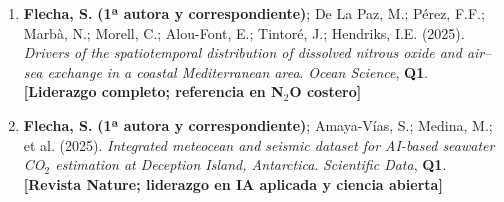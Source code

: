 \documentclass[11pt,a4paper]{article}
\newcommand{\publication}[1]{\item #1}
\begin{document}
\begin{enumerate}[leftmargin=*]
    \publication{\textbf{Flecha, S.} \textbf{(1ª autora y correspondiente)}; De La Paz, M.; Pérez, F.F.; Marbà, N.; Morell, C.; Alou-Font, E.; Tintoré, J.; Hendriks, I.E. (2025). 
    \textit{Drivers of the spatiotemporal distribution of dissolved nitrous oxide and air--sea exchange in a coastal Mediterranean area}. 
    \textit{Ocean Science}, \textbf{Q1}. 
    \textbf{[Liderazgo completo; referencia en N$_2$O costero]}}

    \publication{\textbf{Flecha, S.} \textbf{(1ª autora y correspondiente)}; Amaya-Vías, S.; Medina, M.; et al. (2025). 
    \textit{Integrated meteocean and seismic dataset for AI-based seawater CO$_2$ estimation at Deception Island, Antarctica}. 
    \textit{Scientific Data}, \textbf{Q1}. 
    \textbf{[Revista Nature; liderazgo en IA aplicada y ciencia abierta]}}

\end{enumerate}
\end{document}
